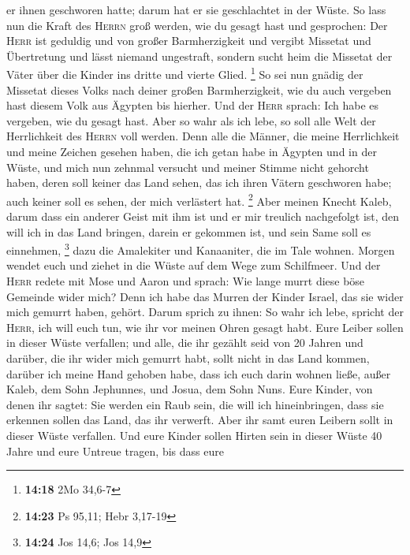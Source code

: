 er ihnen geschworen hatte; darum hat er sie geschlachtet in der Wüste.
 So lass nun die Kraft des \textsc{Herrn} groß werden,
wie du gesagt hast und gesprochen:  Der \textsc{Herr} ist
geduldig und von großer Barmherzigkeit und vergibt Missetat und
Übertretung und lässt niemand ungestraft, sondern sucht heim die
Missetat der Väter über die Kinder ins dritte und vierte Glied.
\footnote{\textbf{14:18} 2Mo 34,6-7}  So sei nun gnädig
der Missetat dieses Volks nach deiner großen Barmherzigkeit, wie du auch
vergeben hast diesem Volk aus Ägypten bis hierher.  Und
der \textsc{Herr} sprach: Ich habe es vergeben, wie du gesagt hast.
 Aber so wahr als ich lebe, so soll alle Welt der
Herrlichkeit des \textsc{Herrn} voll werden.  Denn alle
die Männer, die meine Herrlichkeit und meine Zeichen gesehen haben, die
ich getan habe in Ägypten und in der Wüste, und mich nun zehnmal
versucht und meiner Stimme nicht gehorcht haben,  deren
soll keiner das Land sehen, das ich ihren Vätern geschworen habe; auch
keiner soll es sehen, der mich verlästert hat. \footnote{\textbf{14:23}
  Ps 95,11; Hebr 3,17-19}  Aber meinen Knecht Kaleb,
darum dass ein anderer Geist mit ihm ist und er mir treulich nachgefolgt
ist, den will ich in das Land bringen, darein er gekommen ist, und sein
Same soll es einnehmen, \footnote{\textbf{14:24} Jos 14,6; Jos 14,9}
 dazu die Amalekiter und Kanaaniter, die im Tale wohnen.
Morgen wendet euch und ziehet in die Wüste auf dem Wege zum Schilfmeer.
 Und der \textsc{Herr} redete mit Mose und Aaron und
sprach:  Wie lange murrt diese böse Gemeinde wider mich?
Denn ich habe das Murren der Kinder Israel, das sie wider mich gemurrt
haben, gehört.  Darum sprich zu ihnen: So wahr ich lebe,
spricht der \textsc{Herr}, ich will euch tun, wie ihr vor meinen Ohren
gesagt habt.  Eure Leiber sollen in dieser Wüste
verfallen; und alle, die ihr gezählt seid von 20 Jahren und darüber, die
ihr wider mich gemurrt habt,  sollt nicht in das Land
kommen, darüber ich meine Hand gehoben habe, dass ich euch darin wohnen
ließe, außer Kaleb, dem Sohn Jephunnes, und Josua, dem Sohn Nuns.
 Eure Kinder, von denen ihr sagtet: Sie werden ein Raub
sein, die will ich hineinbringen, dass sie erkennen sollen das Land, das
ihr verwerft.  Aber ihr samt euren Leibern sollt in
dieser Wüste verfallen.  Und eure Kinder sollen Hirten
sein in dieser Wüste 40 Jahre und eure Untreue tragen, bis dass eure
